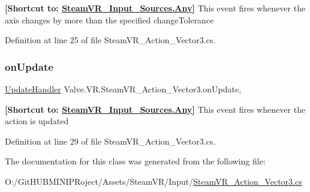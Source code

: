 {\bfseries{\mbox{[}Shortcut to\+: \mbox{\hyperlink{namespace_valve_1_1_v_r_a82e5bf501cc3aa155444ee3f0662853faed36a1ef76a59ee3f15180e0441188ad}{Steam\+V\+R\+\_\+\+Input\+\_\+\+Sources.\+Any}}\mbox{]}}} This event fires whenever the axis changes by more than the specified change\+Tolerance 



Definition at line 25 of file Steam\+V\+R\+\_\+\+Action\+\_\+\+Vector3.\+cs.

\mbox{\label{class_valve_1_1_v_r_1_1_steam_v_r___action___vector3_aa852fea6cefb457d963fae362b2a8b42}} 
\subsubsection{\texorpdfstring{onUpdate}{onUpdate}}
{\footnotesize\ttfamily \mbox{\hyperlink{class_valve_1_1_v_r_1_1_steam_v_r___action___vector3_a99c0524f104c6d8c94a0e874b0ecc813}{Update\+Handler}} Valve.\+V\+R.\+Steam\+V\+R\+\_\+\+Action\+\_\+\+Vector3.\+on\+Update\hspace{0.3cm}{\ttfamily [add]}, {\ttfamily [remove]}}



{\bfseries{\mbox{[}Shortcut to\+: \mbox{\hyperlink{namespace_valve_1_1_v_r_a82e5bf501cc3aa155444ee3f0662853faed36a1ef76a59ee3f15180e0441188ad}{Steam\+V\+R\+\_\+\+Input\+\_\+\+Sources.\+Any}}\mbox{]}}} This event fires whenever the action is updated 



Definition at line 29 of file Steam\+V\+R\+\_\+\+Action\+\_\+\+Vector3.\+cs.



The documentation for this class was generated from the following file\+:\begin{DoxyCompactItemize}
\item 
O\+:/\+Git\+H\+U\+B\+M\+I\+N\+I\+P\+Roject/\+Assets/\+Steam\+V\+R/\+Input/\mbox{\hyperlink{_steam_v_r___action___vector3_8cs}{Steam\+V\+R\+\_\+\+Action\+\_\+\+Vector3.\+cs}}\end{DoxyCompactItemize}

